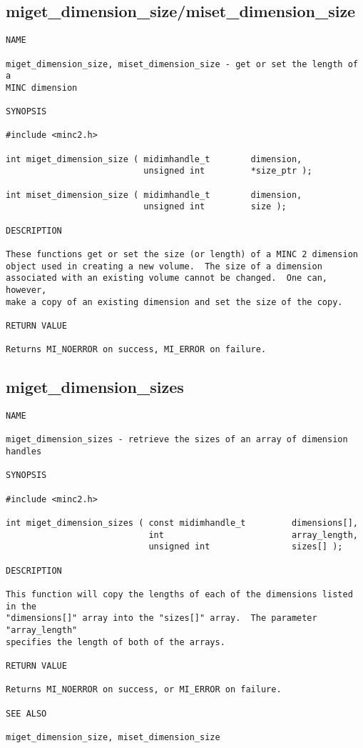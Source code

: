 \documentclass{article}
\begin{document}
\subsection{miget\_dimension\_size/miset\_dimension\_size}
\begin{verbatim}
NAME

miget_dimension_size, miset_dimension_size - get or set the length of a
MINC dimension

SYNOPSIS

#include <minc2.h>

int miget_dimension_size ( midimhandle_t        dimension, 
                           unsigned int         *size_ptr );

int miset_dimension_size ( midimhandle_t        dimension, 
                           unsigned int         size );

DESCRIPTION

These functions get or set the size (or length) of a MINC 2 dimension
object used in creating a new volume.  The size of a dimension
associated with an existing volume cannot be changed.  One can, however,
make a copy of an existing dimension and set the size of the copy. 

RETURN VALUE

Returns MI_NOERROR on success, MI_ERROR on failure.
\end{verbatim}

\subsection{miget\_dimension\_sizes}
\begin{verbatim}
NAME

miget_dimension_sizes - retrieve the sizes of an array of dimension handles

SYNOPSIS

#include <minc2.h>

int miget_dimension_sizes ( const midimhandle_t         dimensions[],
                            int                         array_length,
                            unsigned int                sizes[] );

DESCRIPTION

This function will copy the lengths of each of the dimensions listed in the
"dimensions[]" array into the "sizes[]" array.  The parameter "array_length"
specifies the length of both of the arrays.

RETURN VALUE

Returns MI_NOERROR on success, or MI_ERROR on failure.

SEE ALSO

miget_dimension_size, miset_dimension_size
\end{verbatim}
\end{document}
